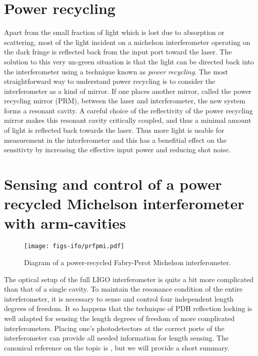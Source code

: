 \section{Power recycling}
Apart from the small fraction of light which is lost due to absorption or scattering, most of the light incident on a michelson interferometer operating on the dark fringe is reflected back from the input port toward the laser. %
The solution to this very un-green situation is that the light can be directed back into the interferometer using a technique known as \emph{power recycling}. %
The most straightforward way to understand power recycling is to consider the interferometer as a kind of mirror. %
If one places another mirror, called the power recycling mirror (PRM), between the laser and interferometer, the new system forms a resonant cavity. %
A careful choice of the reflectivity of the power recycling mirror makes this resonant cavity critically coupled, and thus a minimal amount of light is reflected back towards the laser. %
 Thus more light is usable for measurement in the interferometer and this has a benefitial effect on the sensitivty by increasing the effective input power and reducing shot noise.

\section{Sensing and control of a power recycled Michelson interferometer with arm-cavities}
\begin{figure}
  \begin{center}
  \leavevmode
  \texttt{[image: figs-ifo/prfpmi.pdf]}
  \end{center}
  \caption[Diagram of a power-recycled Fabry-Perot Michelson interferometer.]{Diagram of a power-recycled Fabry-Perot Michelson interferometer. }
  \label{fig:prfpmi}
\end{figure}
The optical setup of the full LIGO interferometer is quite a bit more complicated than that of a single cavity. %
To maintain the resonance condition of the entire interferometer, it is necessary to sense and control four independent length degrees of freedom. %
It so happens that the technique of PDH reflection locking is well adapted for sensing the length degrees of freedom of more complicated interferometers. %
Placing one's photodetectors at the correct ports of the interferometer can provide all needed information for length sensing. %
The canonical reference on the topic is \citet{Fritschel:01}, but we will provide a short summary.

